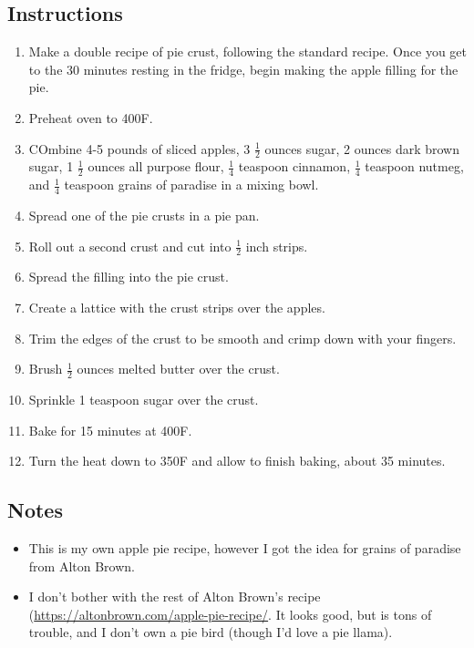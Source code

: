 \begin{multicols}{2}
\subsection*{Instructions}
\begin{enumerate}
    \item Make a double recipe of pie crust, following the standard recipe. Once you get to the 30 minutes resting in the fridge, begin making the apple filling for the pie.
    \item Preheat oven to 400F.
    \item COmbine 4-5 pounds of sliced apples, 3 \( \frac{1}{2} \) ounces sugar, 2 ounces dark brown sugar, 1 \( \frac{1}{2} \) ounces all purpose flour, \( \frac{1}{4} \) teaspoon cinnamon, \( \frac{1}{4} \) teaspoon nutmeg, and \( \frac{1}{4} \) teaspoon grains of paradise in a mixing bowl.
    \item Spread one of the pie crusts in a pie pan.
    \item Roll out a second crust and cut into \( \frac{1}{2} \) inch strips.
    \item Spread the filling into the pie crust.
    \item Create a lattice with the crust strips over the apples.
    \item Trim the edges of the crust to be smooth and crimp down with your fingers.
    \item Brush \( \frac{1}{2} \) ounces melted butter over the crust.
    \item Sprinkle 1 teaspoon sugar over the crust.
    \item Bake for 15 minutes at 400F.
    \item Turn the heat down to 350F and allow to finish baking, about 35 minutes.
\end{enumerate}

\subsection*{Notes}
\begin{itemize}
    \item This is my own apple pie recipe, however I got the idea for grains of paradise from Alton Brown.
    \item I don't bother with the rest of Alton Brown's recipe (\url{https://altonbrown.com/apple-pie-recipe/}. It looks good, but is tons of trouble, and I don't own a pie bird (though I'd love a pie llama).
\end{itemize}
\end{multicols}
\clearpage